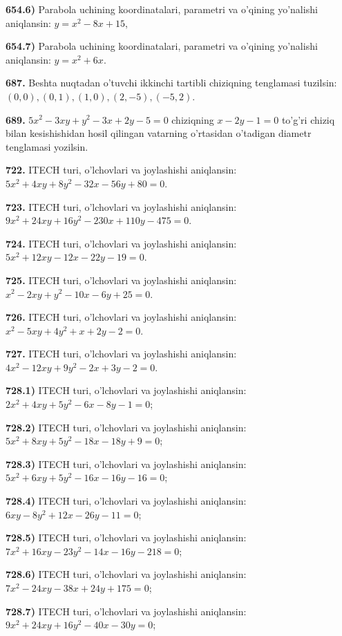 \textbf{654.6)} Parabola uchining koordinatalari, parametri va o'qining yo'nalishi aniqlansin: $y = x^{2} - 8x + 15$,

\textbf{654.7)} Parabola uchining koordinatalari, parametri va o'qining yo'nalishi aniqlansin: $y = x^{2} + 6x$.

\textbf{687.} Beshta nuqtadan o'tuvchi ikkinchi tartibli chiziqning tenglamasi tuzilsin: $(0,0),(0,1),(1,0),(2, - 5),( - 5,2)$.

\textbf{689.} $5x^{2} - 3xy + y^{2} - 3x + 2y - 5 = 0$ chiziqning $x - 2y - 1 = 0$ to'g'ri chiziq bilan kesishishidan hosil qilingan vatarning o'rtasidan o'tadigan diametr tenglamasi yozilsin.

\textbf{722.} ITECH turi, o'lchovlari va joylashishi aniqlansin: $5x^{2} + 4xy + 8y^{2} - 32x - 56y + 80 = 0$.

\textbf{723.} ITECH turi, o'lchovlari va joylashishi aniqlansin: $9x^{2} + 24xy + 16y^{2} - 230x + 110y - 475 = 0$.

\textbf{724.} ITECH turi, o'lchovlari va joylashishi aniqlansin: $5x^{2} + 12xy - 12x - 22y - 19 = 0$.

\textbf{725.} ITECH turi, o'lchovlari va joylashishi aniqlansin: $x^{2} - 2xy + y^{2} - 10x - 6y + 25 = 0$.

\textbf{726.} ITECH turi, o'lchovlari va joylashishi aniqlansin: $x^{2} - 5xy + 4y^{2} + x + 2y - 2 = 0$.

\textbf{727.} ITECH turi, o'lchovlari va joylashishi aniqlansin: $4x^{2} - 12xy + 9y^{2} - 2x + 3y - 2 = 0$.

\textbf{728.1)} ITECH turi, o'lchovlari va joylashishi aniqlansin: $2x^{2} + 4xy + 5y^{2} - 6x - 8y - 1 = 0$;

\textbf{728.2)} ITECH turi, o'lchovlari va joylashishi aniqlansin: $5x^{2} + 8xy + 5y^{2} - 18x - 18y + 9 = 0$;

\textbf{728.3)} ITECH turi, o'lchovlari va joylashishi aniqlansin: $5x^{2} + 6xy + 5y^{2} - 16x - 16y - 16 = 0$;

\textbf{728.4)} ITECH turi, o'lchovlari va joylashishi aniqlansin: $6xy - 8y^{2} + 12x - 26y - 11 = 0$;

\textbf{728.5)} ITECH turi, o'lchovlari va joylashishi aniqlansin: $7x^{2} + 16xy - 23y^{2} - 14x - 16y - 218 = 0$;

\textbf{728.6)} ITECH turi, o'lchovlari va joylashishi aniqlansin: $7x^{2} - 24xy - 38x + 24y + 175 = 0$;

\textbf{728.7)} ITECH turi, o'lchovlari va joylashishi aniqlansin: $9x^{2} + 24xy + 16y^{2} - 40x - 30y = 0$;

